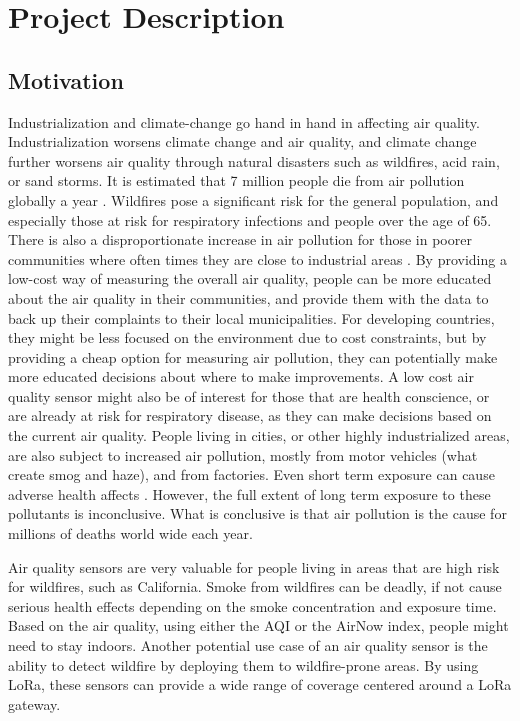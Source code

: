 \section{Project Description}

\subsection{Motivation}
Industrialization and climate-change go hand in hand in affecting air quality.
Industrialization worsens climate change and air quality, and climate change
further worsens air quality through natural disasters such as wildfires, acid
rain, or sand storms. It is estimated that 7 million people die from air
pollution globally a year \cite{interplay-climate-change-air-pollution-health}.
Wildfires pose a significant risk for the general population, and especially
those at risk for respiratory infections and people over the age of 65. There is
also a disproportionate increase in air pollution for those in poorer
communities where often times they are close to industrial areas
\cite{socioeconomic-disparities-air-pollution-review}. By providing a low-cost
way of measuring the overall air quality, people can be more educated about the
air quality in their communities, and provide them with the data to back up
their complaints to their local municipalities. For developing countries, they
might be less focused on the environment due to cost constraints, but by
providing a cheap option for measuring air pollution, they can potentially make
more educated decisions about where to make improvements. A low cost air quality
sensor might also be of interest for those that are health conscience, or are
already at risk for respiratory disease, as they can make decisions based on the
current air quality. People living in cities, or other highly industrialized
areas, are also subject to increased air pollution, mostly from motor vehicles
(what create smog and haze), and from factories. Even short term exposure can
cause adverse health affects \cite{health-impacts-air-pollution-review}.
However, the full extent of long term exposure to these pollutants is
inconclusive. What is conclusive is that air pollution is the cause for millions
of deaths world wide each year.

Air quality sensors are very valuable for people living in areas that are high
risk for wildfires, such as California. Smoke from wildfires can be deadly, if
not cause serious health effects depending on the smoke concentration and
exposure time. Based on the air quality, using either the AQI or the AirNow
index, people might need to stay indoors. Another potential use case of an air
quality sensor is the ability to detect wildfire by deploying them to
wildfire-prone areas. By using LoRa, these sensors can provide a wide range of
coverage centered around a LoRa gateway.



